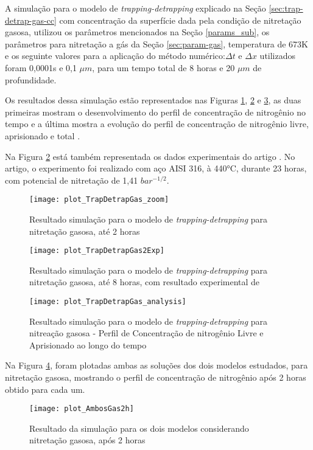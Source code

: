 \FloatBarrier
A simulação para o modelo de \textit{trapping-detrapping} explicado na Seção \ref{sec:trap-detrap-gas-cc} com concentração da superfície dada pela condição de nitretação gasosa, utilizou os parâmetros mencionados na Seção \ref{params_sub}, os parâmetros para nitretação a gás da Seção \ref{sec:param-gas}, temperatura de 673K e os seguinte valores para a aplicação do método numérico:$\Delta t$ e $\Delta x$ utilizados foram 0,0001s e 0,1 $\mu m$, para um tempo total de 8 horas e 20 $\mu m$ de profundidade.

Os resultados dessa simulação estão representados nas Figuras \ref{fig:td-csvar-gas}, \ref{fig:td-csvar-gas-exp} e \ref{fig:td-csvar-gas-both}, as duas primeiras mostram o desenvolvimento do perfil de concentração de nitrogênio no tempo e a última mostra a evolução do perfil de concentração de nitrogênio livre, aprisionado e total .

Na Figura \ref{fig:td-csvar-gas-exp} está também representada os dados experimentais do artigo \cite{christiansen2008nitrogen}. No artigo, o experimento foi realizado com aço AISI 316,  à 440°C, durante 23 horas, com potencial de nitretação de 1,41 $bar^{-1/2}$. 

\begin{figure}[ht]
\centering
	\caption{Resultado simulação para o modelo de \textit{trapping-detrapping} para nitretação gasosa, até 2 horas}
	\texttt{[image: plot\_TrapDetrapGas\_zoom]}
	\label{fig:td-csvar-gas}
	\centering
\end{figure}

\begin{figure}[ht]
\centering
	\caption{Resultado simulação para o modelo de \textit{trapping-detrapping} para nitretação gasosa, até 8 horas, com resultado experimental de \cite{christiansen2008nitrogen}}
	\texttt{[image: plot\_TrapDetrapGas2Exp]}
	\label{fig:td-csvar-gas-exp}
	\centering
\end{figure}


\begin{figure}[ht]
\centering
	\caption{Resultado simulação para o modelo de \textit{trapping-detrapping} para nitreação gasosa - Perfil de Concentração de nitrogênio Livre e Aprisionado ao longo do tempo}
	\texttt{[image: plot\_TrapDetrapGas\_analysis]}
	\label{fig:td-csvar-gas-both}
	\centering
\end{figure}

Na Figura \ref{fig:td-csvar-gas-compara}, foram plotadas ambas as soluções dos dois modelos estudados, para nitretação gasosa, mostrando o perfil de concentração de nitrogênio após 2 horas obtido para cada um.

\begin{figure}[ht]
\centering
	\caption{Resultado da simulação para os dois modelos considerando nitretação gasosa, após 2 horas }
	\texttt{[image: plot\_AmbosGas2h]}
	\label{fig:td-csvar-gas-compara}
	\centering
\end{figure}
\FloatBarrier